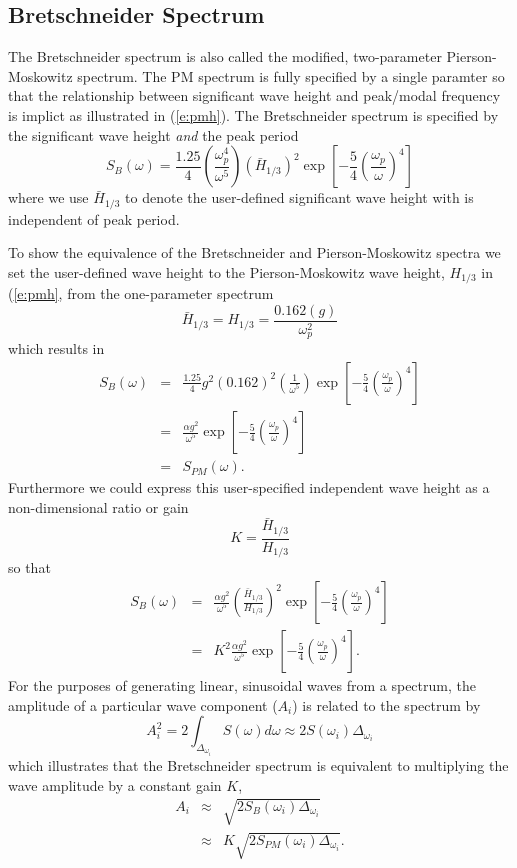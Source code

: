 \documentclass[11pt]{article}
\begin{document}
\subsection{Bretschneider Spectrum}
The Bretschneider spectrum is also called the modified, two-parameter Pierson-Moskowitz spectrum.   The PM spectrum is fully specified by a single paramter so that the relationship between significant wave height and peak/modal frequency is implict as illustrated in (\ref{e:pmh}).  The Bretschneider spectrum is specified by the significant wave height \emph{and} the peak period
\begin{equation}
  S_B(\omega) = \frac{1.25}{4} \left(\frac{\omega_p^4}{\omega^5}\right) (\bar{H}_{1/3})^2 \exp{\left[-\frac{5}{4} \left(\frac{\omega_p}{\omega}\right)^4\right]}
    \label{e:bs}
\end{equation}
where we use $\bar{H}_{1/3}$ to denote the user-defined significant wave height with is independent of peak period.

To show the equivalence of the Bretschneider and Pierson-Moskowitz spectra  we set the user-defined wave height to the Pierson-Moskowitz wave height, $H_{1/3}$ in (\ref{e:pmh}, from the one-parameter spectrum 
\begin{equation}
  \bar{H}_{1/3} = H_{1/3}=\frac{0.162(g)}{\omega_p^2}
\end{equation}
which results in
\begin{eqnarray}
  S_B(\omega) & = & \frac{1.25}{4} g^2 (0.162)^2 \left(\frac{1}{\omega^5}\right) \exp{\left[-\frac{5}{4} \left(\frac{\omega_p}{\omega}\right)^4\right]}\\
  & = & \frac{\alpha g^2}{\omega^5} \exp{\left[-\frac{5}{4} \left(\frac{\omega_p}{\omega}\right)^4\right]}\\
  & = & S_{PM}(\omega).
\end{eqnarray}
Furthermore we could express this user-specified independent wave height as a non-dimensional ratio or gain
\begin{equation}
  K = \frac{\bar{H}_{1/3}}{H_{1/3}}
\end{equation}
so that
\begin{eqnarray}
  S_B(\omega)  & = & \frac{\alpha g^2}{\omega^5} \left(\frac{\bar{H}_{1/3}}{H_{1/3}}\right)^2 \exp{\left[-\frac{5}{4} \left(\frac{\omega_p}{\omega}\right)^4\right]}\\
  & = & K^2 \frac{\alpha g^2}{\omega^5} \exp{\left[-\frac{5}{4} \left(\frac{\omega_p}{\omega}\right)^4\right]}.
\end{eqnarray}
For the purposes of generating linear, sinusoidal waves from a spectrum, the amplitude of a particular wave component ($A_i$) is related to the spectrum by
\begin{equation}
  A_i^2 = 2 \int_{\Delta_{\omega_i}}S(\omega) d\omega \approx 2 S(\omega_i) \Delta_{\omega_i}
\end{equation}
which illustrates that the Bretschneider spectrum is equivalent to multiplying the wave amplitude by a constant gain $K$,
\begin{eqnarray}
  A_i & \approx & \sqrt{2 S_B(\omega_i) \Delta_{\omega_i}} \\
      & \approx & K \sqrt{2 S_{PM}(\omega_i) \Delta_{\omega_i}} . 
\end{eqnarray}
\end{document}
